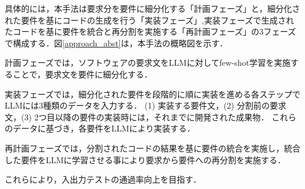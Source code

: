 \documentclass[submit,techrep,noauthor]{ipsj}
\newcommand{\todo}[1]{\colorbox{yellow}{{\bf TODO}:}{\color{red} {\textbf{[#1]}}}}
\begin{document}
具体的には，本手法は要求分を要件に細分化する「計画フェーズ」と，細分化された要件を基にコードの生成を行う「実装フェーズ」,実装フェーズで生成されたコードを基に要件を統合と再分割を実施する「再計画フェーズ」の3フェーズで構成する．図\ref{approach_abst}は，本手法の概略図を示す．

計画フェーズでは，ソフトウェアの要求文をLLMに対してfew-shot学習を実施することで，要求文を要件に細分化する．

実装フェーズでは，細分化された要件を段階的に順に実装を進める各ステップでLLMには3種類のデータを入力する．
(1) 実装する要件文，(2) 分割前の要求文，(3) 2つ目以降の要件の実装時には，それまでに開発された成果物．
これらのデータに基づき，各要件をLLMにより実装する．

再計画フェーズでは，分割されたコードの結果を基に要件の統合を実施し，統合した要件をLLMに学習させる事により要求から要件への再分割を実施する．

これらにより，入出力テストの通過率向上を目指す．






\end{document}
